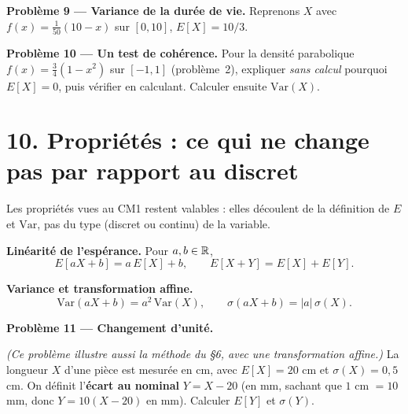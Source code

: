 \medskip

\textbf{Problème 9 --- Variance de la durée de vie.}
Reprenons $X$ avec $f(x)=\tfrac{1}{50}(10-x)$ sur $[0,10]$,
$E[X]=10/3$.


\textbf{Problème 10 --- Un test de cohérence.}
Pour la densité \og parabolique \fg{}
$f(x)=\tfrac{3}{4}(1-x^2)$ sur $[-1,1]$ (problème~2),
expliquer \emph{sans calcul} pourquoi $E[X]=0$,
puis vérifier en calculant. Calculer ensuite $\text{Var}(X)$.


\section*{10. Propriétés : ce qui ne change pas par rapport au discret}

Les propriétés vues au CM1 restent valables : elles découlent
de la définition de $E$ et $\text{Var}$, pas du type
(discret ou continu) de la variable.

\medskip

\textbf{Linéarité de l'espérance.}
Pour $a,b\in\mathbb{R}$,
\[
  E[aX+b]=a\,E[X]+b,
  \qquad
  E[X+Y]=E[X]+E[Y].
\]

\textbf{Variance et transformation affine.}
\[
  \text{Var}(aX+b)=a^2\,\text{Var}(X),
  \qquad
  \sigma(aX+b)=|a|\,\sigma(X).
\]

\textbf{Problème 11 --- Changement d'unité.}

\textit{(Ce problème illustre aussi la méthode du §6, avec une
transformation affine.)}
La longueur $X$ d'une pièce est mesurée en cm, avec
$E[X]=20$ cm et $\sigma(X)=0{,}5$ cm.
On définit l'\textbf{écart au nominal} $Y=X-20$ (en mm,
sachant que $1$ cm $=10$ mm, donc $Y=10(X-20)$ en mm).
Calculer $E[Y]$ et $\sigma(Y)$.

